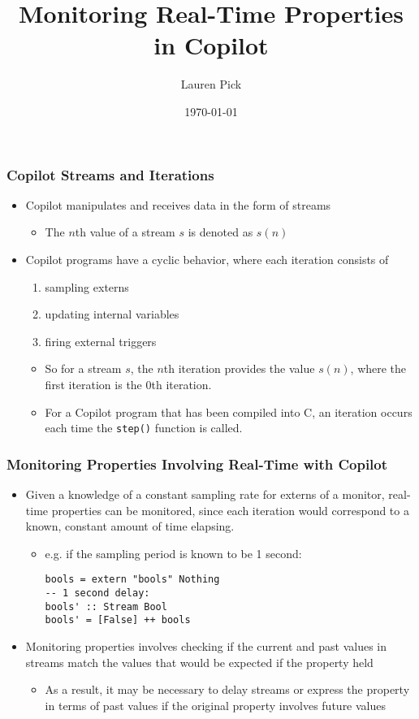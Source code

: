 \documentclass{beamer}
\title{Monitoring Real-Time Properties in Copilot}
\author{Lauren Pick}
\date{\today}
\begin{document}
\maketitle

\begin{frame}[fragile]
\frametitle{Copilot Streams and Iterations}
\begin{itemize}
\item Copilot manipulates and receives data in the form of streams
  \begin{itemize}
  \item The $n$th value of a stream $s$ is denoted as $s(n)$
  \end{itemize}
\item Copilot programs have a cyclic behavior, where each iteration consists of
  \begin{enumerate}
  \item sampling externs
  \item updating internal variables
  \item firing external triggers
  \end{enumerate}
  \begin{itemize}
  \item So for a stream $s$, the $n$th iteration provides the value
        $s(n)$, where the first iteration is the 0th iteration.
  \item For a Copilot program that has been compiled into C, an iteration
        occurs each time the \verb,step(), function is called.
  \end{itemize}
\end{itemize}
\end{frame}

\begin{frame}[fragile]
\frametitle{Monitoring Properties Involving Real-Time with Copilot}
\begin{itemize}
\item Given a knowledge of a constant sampling rate for externs of a monitor,
real-time properties can be monitored, since each iteration would
correspond to a known, constant amount of time elapsing.
  \begin{itemize}
  \item e.g. if the sampling period is known to be 1 second:
\begin{lstlisting}
bools = extern "bools" Nothing
-- 1 second delay:
bools' :: Stream Bool
bools' = [False] ++ bools
\end{lstlisting}
  \end{itemize}
\item Monitoring properties involves checking if the current and past values
in streams match the values that would be expected if the property held
  \begin{itemize}
  \item As a result, it may be necessary to delay streams or express
  the property in terms of past values if the original property involves future
  values
  \end{itemize}
\end{itemize}
\end{frame}
\end{document}

